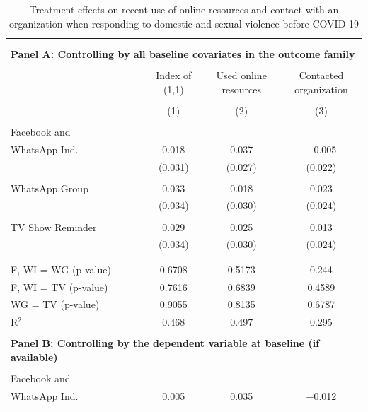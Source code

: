\documentclass[12pt]{article}
\begin{document}
\begin{table}[H] \centering 
\vspace*{-1cm}  \caption{Treatment effects on recent use of online resources and contact with an organization when responding to domestic and sexual violence before COVID-19} 
  \label{} 
\footnotesize 
\begin{tabular}{@{\extracolsep{25pt}}lccc} 
\\[-1.8ex]\hline 
\hline \\[-1.8ex] 
\\[-0.5ex] 
\multicolumn{4}{l}{\textbf{Panel A: Controlling by all baseline covariates in the outcome family}} \\
\hline \\[-1ex] 
 & \shortstack{Index of \\ (1,1) } & \shortstack{Used online \\ resources} & \shortstack{Contacted \\ organization} \\ 
\\[-1.8ex] & (1) & (2) & (3)\\ 
\hline \\[-1.8ex] 
 Facebook and \\ WhatsApp Ind. & 0.018 & 0.037 & $-$0.005 \\ 
  & (0.031) & (0.027) & (0.022) \\ 
  & & & \\ 
 WhatsApp Group & 0.033 & 0.018 & 0.023 \\ 
  & (0.034) & (0.030) & (0.024) \\ 
  & & & \\ 
 TV Show Reminder & 0.029 & 0.025 & 0.013 \\ 
  & (0.034) & (0.030) & (0.024) \\ 
  & & & \\ 
\hline \\[-1.8ex] 
F, WI = WG (p-value) & 0.6708 & 0.5173 & 0.244 \\ 
F, WI = TV (p-value) & 0.7616 & 0.6839 & 0.4589 \\ 
WG = TV (p-value) & 0.9055 & 0.8135 & 0.6787 \\ 
R$^{2}$ & 0.468 & 0.497 & 0.295 \\ 
\hline 
\\[-0.5ex] 
\multicolumn{4}{l}{\textbf{Panel B: Controlling by the dependent variable at baseline (if available)}} \\
\hline \\[-1ex]  
 Facebook and \\ WhatsApp Ind. & 0.005 & 0.035 & $-$0.012 \\ 

\end{tabular}
\end{table}
\end{document}
